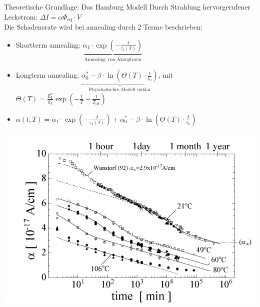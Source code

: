 \documentclass[aspectratio=1610, 9pt]{beamer}
\begin{document}
\begin{frame}{Theoretische Grundlage: Das Hamburg Modell}
  Durch Strahlung hervorgerufener Leckstrom: \:$\Delta I = \alpha \Phi_{\mathrm{eq}} \cdot V $ \\
  \medskip
  Die Schadensrate wird bei annealing durch 2 Terme beschrieben:
  \medskip
  \begin{itemize}
    \item Shortterm annealing:\: $\underbrace{\alpha_I \cdot \exp{\left(-\frac{t}{\tau_{\mathrm{I}}(T)}\right)}}_{\text{Annealing von Akzeptoren}}$
    \medskip
    \item Longterm annealing:\: $\underbrace{\alpha_{\mathrm{0}}^{*} -\beta \cdot \ln{\left(\Theta(T) \cdot \frac{t}{t_{\mathrm{0}}}\right)}}_{\text{Physikalisches Modell unklar}}$, \:\:\: mit \: $\Theta(T) = \frac{E_{\mathrm{I}}^*}{k_b} \exp{\left(-\frac{1}{T}-\frac{1}{T_{\mathrm{ref}}}\right)}$
    \medskip
    \item $\alpha(t, T) = \alpha_I \cdot \exp{\left(-\frac{t}{\tau_{\mathrm{I}}(T)}\right)} + \alpha_{\mathrm{0}}^{*} -\beta \cdot \ln{\left(\Theta(T) \cdot \frac{t}{t_{\mathrm{0}}}\right)}$
  \end{itemize}
  \medskip
  \hfill
  \begin{minipage}[b]{0.35\linewidth}
    \vspace{-1cm} \hspace{-2cm}
  \includegraphics[height=11\baselineskip]{images/schadensraten.png}
  \end{minipage}
\end{frame}
\end{document}
